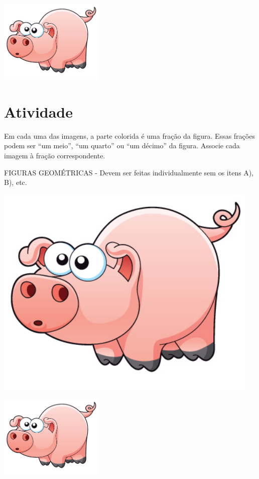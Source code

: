 \documentclass[a4,12pt]{book}
\begin{document}
\includegraphics[width=\textwidth,height=4cm, keepaspectratio]{pig}
\section{Atividade}










Em cada uma das imagens, a parte colorida é uma fração da figura. Essas frações podem ser ``um meio'', ``um quarto'' ou ``um décimo'' da figura. Associe cada imagem à fração correspondente.

\begin{imagem*}[breakable]{}{}   FIGURAS GEOMÉTRICAS - Devem ser feitas individualmente sem os itens A), B), etc.

    \includegraphics[width=360pt, keepaspectratio]{pig}


\end{imagem*}







\includegraphics[width=\textwidth,height=4cm, keepaspectratio]{pig}
\end{document}
